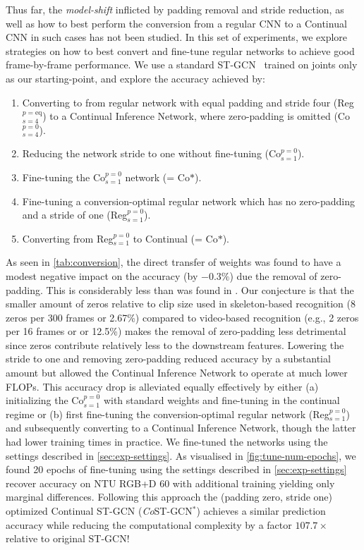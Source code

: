 \documentclass[journal]{IEEEtran}
\theoremstyle{definition}
\begin{document}
Thus far, the \textit{model-shift} inflicted by padding removal and stride reduction, as well as how to best perform the conversion from a regular CNN to a Continual CNN in such cases has not been studied. 
In this set of experiments, we explore strategies on how to best convert and fine-tune regular networks to achieve good frame-by-frame performance.
We use a standard ST-GCN~\cite{yan2018spatial} trained on joints only as our starting-point, and explore the accuracy achieved by:
\begin{enumerate}
    \itemsep0em 
    \item Converting to from regular network with equal padding and stride four (Reg$_{s=4}^{p=\text{eq}}$) to a Continual Inference Network, where zero-padding is omitted (Co$_{s=4}^{p=0}$).
    \item Reducing the network stride to one without fine-tuning (Co$_{s=1}^{p=0}$).
    \item Fine-tuning the Co$_{s=1}^{p=0}$ network (= Co${*}$).
    \item Fine-tuning a conversion-optimal regular network which has no zero-padding and a stride of one (Reg$_{s=1}^{p=0}$).
    \item Converting from Reg$_{s=1}^{p=0}$ to Continual (= Co${*}$).
\end{enumerate}
As seen in \cref{tab:conversion}, the direct transfer of weights was found to have a modest negative impact on the accuracy (by $-0.3\%$) due the removal of zero-padding. This is considerably less than was found in \cite{hedegaard2021continual}. Our conjecture is that the smaller amount of zeros relative to clip size used in skeleton-based recognition (8 zeros per 300 frames or 2.67\%) compared to video-based recognition (e.g., 2 zeros per 16 frames or or 12.5\%) makes the removal of zero-padding less detrimental since zeros contribute relatively less to the downstream features.
Lowering the stride to one and removing zero-padding reduced accuracy by a substantial amount but allowed the Continual Inference Network to operate at much lower FLOPs. This accuracy drop is alleviated equally effectively by either (a) initializing the Co$_{s=1}^{p=0}$ with standard weights and fine-tuning in the continual regime or (b) first fine-tuning the conversion-optimal regular network (Reg$_{s=1}^{p=0}$) and subsequently converting to a Continual Inference Network, though the latter had lower training times in practice.
We fine-tuned the networks using the settings described in \cref{sec:exp-settings}.
As visualised in \cref{fig:tune-num-epochs}, we found 20 epochs of fine-tuning using the settings described in \cref{sec:exp-settings} recover accuracy on NTU RGB+D 60 with additional training yielding only marginal differences. 
Following this approach the (padding zero, stride one) optimized Continual ST-GCN (\textit{Co}ST-GCN$^*$) achieves a similar prediction accuracy while reducing the computational complexity by a factor $107.7\times$ relative to original ST-GCN!
\end{document}
